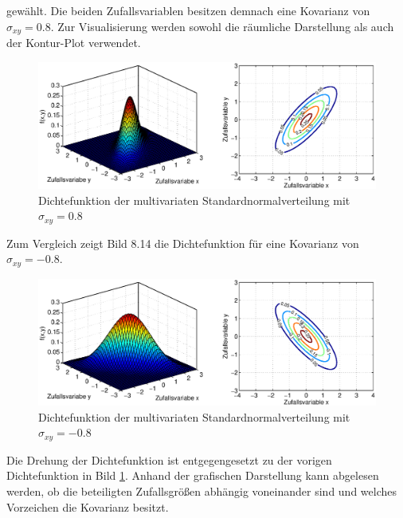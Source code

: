 \noindent gew\"{a}hlt. Die beiden Zufallsvariablen besitzen demnach eine Kovarianz von $\sigma_{xy} = 0.8$. Zur Visualisierung werden sowohl die r\"{a}umliche Darstellung als auch der Kontur-Plot verwendet.

\clearpage

\noindent 
\begin{figure}[H]
  \centerline{\includegraphics[width=1\textwidth]{Kapitel8/Bilder/image13}}
  \caption{ Dichtefunktion der multivariaten Standardnormalverteilung mit $\sigma_{xy} = 0.8$}
  \label{fig:MultivarianteVerteilungen4}
\end{figure}

\noindent Zum Vergleich zeigt Bild 8.14 die Dichtefunktion f\"{u}r eine Kovarianz von $\sigma_{xy} = -0.8$. 

\noindent 
\begin{figure}[H]
  \centerline{\includegraphics[width=1\textwidth]{Kapitel8/Bilder/image14}}
  \caption{ Dichtefunktion der multivariaten Standardnormalverteilung mit $\sigma_{xy} = -0.8$}
  \label{fig:MultivarianteVerteilungen5}
\end{figure}

\noindent Die Drehung der Dichtefunktion ist entgegengesetzt zu der vorigen Dichtefunktion in Bild \ref{fig:MultivarianteVerteilungen4}. Anhand der grafischen Darstellung kann abgelesen werden, ob die beteiligten Zufallsgr\"{o}{\ss}en abh\"{a}ngig voneinander sind und welches Vorzeichen die Kovarianz besitzt.\newline

